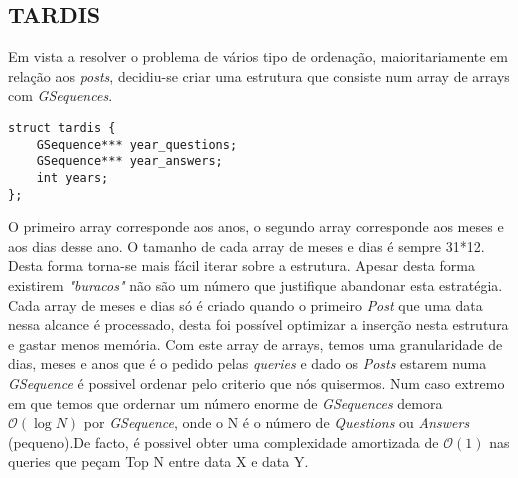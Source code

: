 \documentclass[letterpaper, 10 pt, conference]{IEEEtran}  %
\begin{document}
\subsection{TARDIS}

Em vista a resolver o problema de vários tipo de ordenação, maioritariamente em relação aos \textit{posts}, decidiu-se criar uma estrutura que consiste num array de arrays com \textit{GSequences}.
\begin{lstlisting}
struct tardis {
    GSequence*** year_questions;
    GSequence*** year_answers;
    int years;
};

\end{lstlisting}
O primeiro array corresponde aos anos, o segundo array corresponde aos meses e aos dias desse ano. O tamanho de cada array de meses e dias é sempre 31*12. Desta forma torna-se mais fácil iterar sobre a estrutura. Apesar desta forma existirem \textit{"buracos"} não são um número que justifique abandonar esta estratégia.
Cada array de meses e dias só é criado quando o primeiro \textit{Post} que uma data nessa alcance é processado, desta foi possível optimizar a inserção nesta estrutura e gastar menos memória.
Com este array de arrays, temos uma granularidade de dias, meses e anos que é o pedido pelas \textit{queries} e dado os \textit{Posts} estarem numa \textit{GSequence} é possivel ordenar pelo criterio que nós quisermos.
Num caso extremo em que temos que ordernar um número enorme de \textit{GSequences} demora $\mathcal{O}(\log{}N)$ por \textit{GSequence}, onde o N é o número de \textit{Questions} ou \textit{Answers} (pequeno).De facto, é possivel obter uma complexidade amortizada de $\mathcal{O}(1)$ nas queries que peçam Top N entre data X e data Y.


\end{document}
